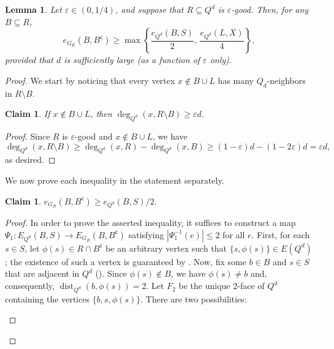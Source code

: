 \documentclass[11pt,a4paper,oneside,reqno]{amsart}
\newtheorem{lemma}[theorem]{Lemma}
\newtheorem{claim}[theorem]{Claim}
\DeclareMathOperator{\dist}{dist}
\newcommand{\eps}{\varepsilon}
\begin{document}
\begin{lemma}\label{lem:deterministic}
  Let $\eps \in (0, 1/4)$, and suppose that $R\subseteq Q^d$ is $\eps$-good.  Then, for any $B\subseteq R$,
  \[
    e_{G_R}(B,B^\mathsf{c})\geq \max\left\{\frac{e_{Q^d}(B,S)}{2},\, \frac{e_{Q^d}(L,X)}{4}\right\},
  \]
  provided that $d$ is sufficiently large (as a function of $\eps$ only).
\end{lemma}

\begin{proof}

  We start by noticing that every vertex $x \notin B\cup L$ has many $Q_d$-neighbors in $R \setminus B$. 

  \begin{claim}\label{clm:posdegree}
    If $x \notin B \cup L$, then $\deg_{Q^d}(x, R \setminus B) \geq \eps d$.
  \end{claim}
  \begin{proof}
    Since $R$ is $\eps$-good and $x \notin B \cup L$, we have
    \[
      \deg_{Q^d}(x, R \setminus B) \geq \deg_{Q^d}(x,R) - \deg_{Q^d}(x,B) \geq (1-\eps)d - (1-2\eps)d = \eps d,
    \]
    as desired.
  \end{proof}

  We now prove each inequality in the statement separately.

  \begin{claim}
    $e_{G_R}(B,B^{\mathsf{c}}) \geq e_{Q^d}(B,S)/2$.
  \end{claim}

  \begin{proof}
    In order to prove the asserted inequality, it suffices to construct a map $\Psi_1 \colon E_{Q^d}(B,S)\rightarrow E_{G_R}(B,B^{\mathsf{c}})$ satisfying $|\Psi_1^{-1}(e)| \le 2$ for all $e$.
    First, for each $s \in S$, let $\phi(s) \in R \cap B^{\mathsf{c}}$ be an arbitrary vertex such that $\{s,\phi(s)\} \in E(Q^d)$; the existence of such a vertex is guaranteed by .
    Now, fix some $b \in B$ and $s \in S$ that are adjacent in $Q^d$ ().
    Since $\phi(s) \notin B$, we have $\phi(s)\neq b$ and, consequently, $\dist_{Q^d}(b,\phi(s))=2$.
    Let $F_2$ be the unique $2$-face of $Q^d$ containing the vertices $\{b,s,\phi(s)\}$. There are two possibilities:

    \begin{figure}[h]
      \centering
      {\hfil {}}
\end{figure}
\end{proof}
\end{proof}
\end{document}
